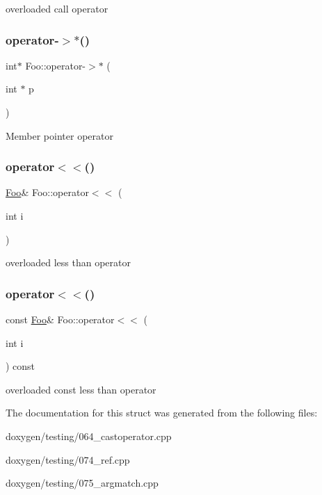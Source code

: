 overloaded call operator \mbox{\label{struct_foo_a0514e1f5b30cbf77e1c39d7aba308656}} 
\subsubsection{\texorpdfstring{operator-\/$>$$\ast$()}{operator->*()}}
{\footnotesize\ttfamily int$\ast$ Foo\+::operator-\/$>$$\ast$ (\begin{DoxyParamCaption}\item[{int $\ast$}]{p }\end{DoxyParamCaption})}

Member pointer operator \mbox{\label{struct_foo_a279debd94d894223fa8468933e2d6188}} 
\subsubsection{\texorpdfstring{operator$<$$<$()}{operator<<()}\hspace{0.1cm}{\footnotesize\ttfamily [1/2]}}
{\footnotesize\ttfamily \mbox{\hyperlink{struct_foo}{Foo}}\& Foo\+::operator$<$$<$ (\begin{DoxyParamCaption}\item[{int}]{i }\end{DoxyParamCaption})}

overloaded less than operator \mbox{\label{struct_foo_a48bcc3de9b2f1ad09a3518a0c9f0da61}} 
\subsubsection{\texorpdfstring{operator$<$$<$()}{operator<<()}\hspace{0.1cm}{\footnotesize\ttfamily [2/2]}}
{\footnotesize\ttfamily const \mbox{\hyperlink{struct_foo}{Foo}}\& Foo\+::operator$<$$<$ (\begin{DoxyParamCaption}\item[{int}]{i }\end{DoxyParamCaption}) const}

overloaded const less than operator 

The documentation for this struct was generated from the following files\+:\begin{DoxyCompactItemize}
\item 
doxygen/testing/064\+\_\+castoperator.\+cpp\item 
doxygen/testing/074\+\_\+ref.\+cpp\item 
doxygen/testing/075\+\_\+argmatch.\+cpp\end{DoxyCompactItemize}
